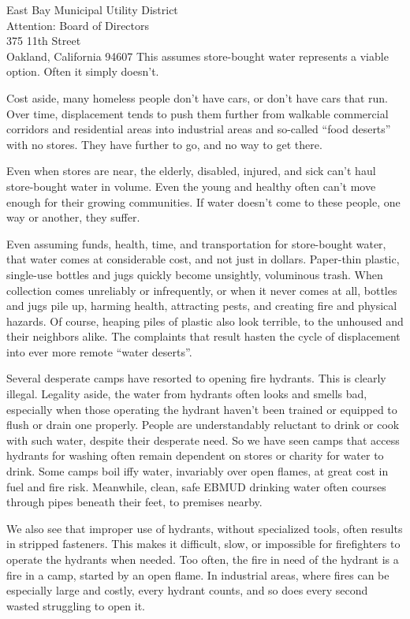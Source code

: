 \documentclass[letterpaper]{letter}
\begin{document}
\begin{letter}{%
    East Bay Municipal Utility District\\
    Attention: Board of Directors\\
    375 11th Street\\
    Oakland, California 94607}
    This assumes store-bought water represents a viable option. Often it simply doesn’t.

    Cost aside, many homeless people don’t have cars, or don’t have cars that run. Over time, displacement tends to push them further from walkable commercial corridors and residential areas into industrial areas and so-called “food deserts” with no stores. They have further to go, and no way to get there.

    Even when stores are near, the elderly, disabled, injured, and sick can’t haul store-bought water in volume. Even the young and healthy often can’t move enough for their growing communities. If water doesn’t come to these people, one way or another, they suffer.

    Even assuming funds, health, time, and transportation for store-bought water, that water comes at considerable cost, and not just in dollars. Paper-thin plastic, single-use bottles and jugs quickly become unsightly, voluminous trash. When collection comes unreliably or infrequently, or when it never comes at all, bottles and jugs pile up, harming health, attracting pests, and creating fire and physical hazards. Of course, heaping piles of plastic also look terrible, to the unhoused and their neighbors alike. The complaints that result hasten the cycle of displacement into ever more remote “water deserts”.

    Several desperate camps have resorted to opening fire hydrants. This is clearly illegal. Legality aside, the water from hydrants often looks and smells bad, especially when those operating the hydrant haven’t been trained or equipped to flush or drain one properly. People are understandably reluctant to drink or cook with such water, despite their desperate need. So we have seen camps that access hydrants for washing often remain dependent on stores or charity for water to drink. Some camps boil iffy water, invariably over open flames, at great cost in fuel and fire risk. Meanwhile, clean, safe EBMUD drinking water often courses through pipes beneath their feet, to premises nearby.

    We also see that improper use of hydrants, without specialized tools, often results in stripped fasteners. This makes it difficult, slow, or impossible for firefighters to operate the hydrants when needed. Too often, the fire in need of the hydrant is a fire in a camp, started by an open flame. In industrial areas, where fires can be especially large and costly, every hydrant counts, and so does every second wasted struggling to open it.


\end{letter}
\end{document}
